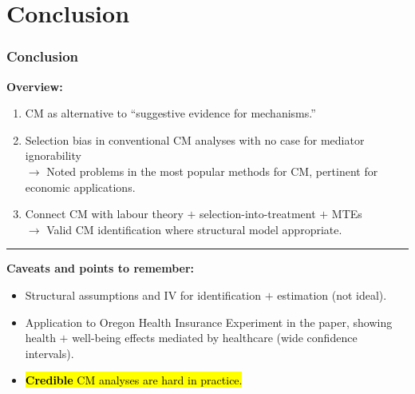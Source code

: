 \documentclass[dvipsnames]{beamer} %
\makeatletter
\let\HL\hl
\renewcommand\hl{%
    \let\set@color\beamerorig@set@color
    \let\reset@color\beamerorig@reset@color
    \HL}
\makeatother
\begin{document}
\section{Conclusion}
\begin{frame}
    \frametitle{Conclusion}
    \textbf{Overview:}
    \begin{enumerate}
        \item CM as alternative to ``suggestive evidence for mechanisms.''
        \item Selection bias in conventional CM analyses with no case for mediator ignorability \\
        $\to$ Noted problems in the most popular methods for CM, pertinent for economic applications.
        \item Connect CM with labour theory $+$ selection-into-treatment $+$ MTEs \\
        $\to$ Valid CM identification where structural model appropriate.
    \end{enumerate}
    \par\noindent\rule{\textwidth}{0.4pt}
    \small
    \textbf{Caveats and points to remember:}
    \begin{itemize}
        \item Structural assumptions and IV for identification $+$ estimation (not ideal).
        \item Application to Oregon Health Insurance Experiment in the paper, showing health $+$ well-being effects mediated by healthcare (wide confidence intervals).
        \item \hl{\textbf{Credible} CM analyses are hard in practice.}
    \end{itemize}
\end{frame}
\end{document}
